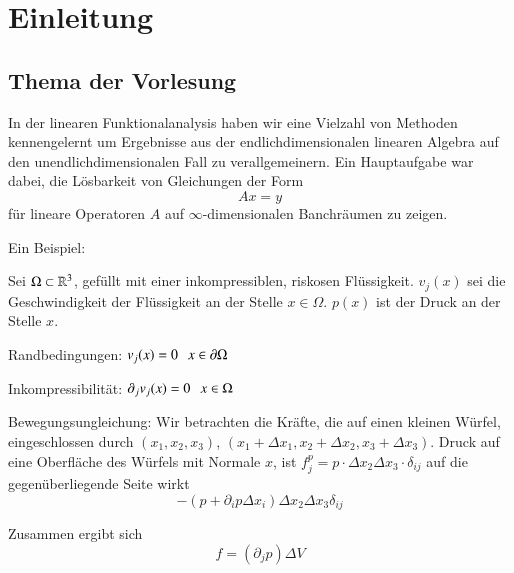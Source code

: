 \section{Einleitung}

\subsection{Thema der Vorlesung}

In der linearen Funktionalanalysis haben wir eine Vielzahl von Methoden kennengelernt um
Ergebnisse aus der endlichdimensionalen linearen Algebra auf den unendlichdimensionalen Fall 
zu verallgemeinern. Ein Hauptaufgabe war dabei, die Lösbarkeit von Gleichungen der Form
\[
    Ax=y
\]
für lineare Operatoren $A$ auf $\infty$-dimensionalen Banchräumen zu zeigen.
\begin{description}
    \item{Ein Beispiel:}
    
    Sei $\Omega\subset\mathbb{R}^3$, gefüllt mit einer inkompressiblen, riskosen Flüssigkeit.
    $v_j(x)$ sei die Geschwindigkeit der Flüssigkeit an der Stelle $x\in \Omega$. 
    $p(x)$ ist der Druck an der Stelle $x$.
    \begin{description}
    \item{Randbedingungen:}
    $v_j(x)=0 \hspace{.25cm} x\in \partial\Omega$
    \item{Inkompressibilität:}
    $\partial_jv_j(x)=0 \hspace{.25cm} x\in \Omega$
    \item{Bewegungsungleichung:}
    Wir betrachten die Kräfte, die auf einen kleinen Würfel, eingeschlossen durch
    $(x_1,x_2,x_3)$, $(x_1+\Delta x_1, x_2+\Delta x_2, x_3+\Delta x_3)$. Druck auf eine Oberfläche
    des Würfels mit Normale $x$, ist $f_j^p=p\cdot \Delta x_2 \Delta x_3 \cdot \delta_{ij} $ auf die
    gegenüberliegende Seite wirkt
    \[
        -(p+\partial _i p \Delta x_i) \Delta x_2 \Delta x_3 \delta_{ij}
    \]
    \end{description}
Zusammen ergibt sich 
\[
    f=(\partial_j p)\Delta V
\]


\end{description}
